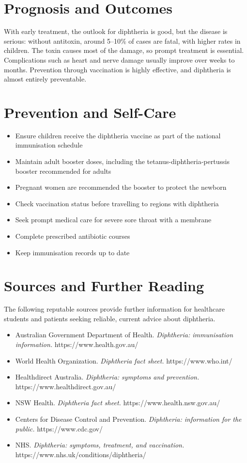 \section*{Prognosis and Outcomes}
With early treatment, the outlook for diphtheria is good, but the disease is serious: without antitoxin, around 5--10\% of cases are fatal, with higher rates in children. The toxin causes most of the damage, so prompt treatment is essential. Complications such as heart and nerve damage usually improve over weeks to months. Prevention through vaccination is highly effective, and diphtheria is almost entirely preventable.

\section*{Prevention and Self-Care}
\begin{itemize}
    \item Ensure children receive the diphtheria vaccine as part of the national immunisation schedule
    \item Maintain adult booster doses, including the tetanus-diphtheria-pertussis booster recommended for adults
    \item Pregnant women are recommended the booster to protect the newborn
    \item Check vaccination status before travelling to regions with diphtheria
    \item Seek prompt medical care for severe sore throat with a membrane
    \item Complete prescribed antibiotic courses
    \item Keep immunisation records up to date
\end{itemize}

\section*{Sources and Further Reading}
The following reputable sources provide further information for healthcare students and patients seeking reliable, current advice about diphtheria.

\begin{itemize}
    \item Australian Government Department of Health. \textit{Diphtheria: immunisation information.} https://www.health.gov.au/
    \item World Health Organization. \textit{Diphtheria fact sheet.} https://www.who.int/
    \item Healthdirect Australia. \textit{Diphtheria: symptoms and prevention.} https://www.healthdirect.gov.au/
    \item NSW Health. \textit{Diphtheria fact sheet.} https://www.health.nsw.gov.au/
    \item Centers for Disease Control and Prevention. \textit{Diphtheria: information for the public.} https://www.cdc.gov/
    \item NHS. \textit{Diphtheria: symptoms, treatment, and vaccination.} https://www.nhs.uk/conditions/diphtheria/
\end{itemize}
